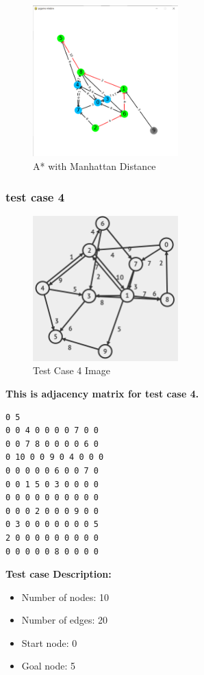 \begin{figure}[h!]
    \centering
    \includegraphics[width=0.5\textwidth]{result/testcase3/astar2.png}
    \caption{A* with Manhattan Distance}
\end{figure}
\clearpage 

\subsubsection{test case 4}
\begin{figure}[h!]
    \centering
    \includegraphics[width=0.5\textwidth]{testcase/4.PNG}
    \caption{Test Case 4 Image}
\end{figure}
\textbf{This is adjacency matrix for test case 4.}
\begin{verbatim}
0 5
0 0 4 0 0 0 0 7 0 0
0 0 7 8 0 0 0 0 6 0
0 10 0 0 9 0 4 0 0 0
0 0 0 0 0 6 0 0 7 0
0 0 1 5 0 3 0 0 0 0
0 0 0 0 0 0 0 0 0 0
0 0 0 2 0 0 0 9 0 0
0 3 0 0 0 0 0 0 0 5
2 0 0 0 0 0 0 0 0 0
0 0 0 0 0 8 0 0 0 0   
\end{verbatim}
\textbf{Test case Description:}
\begin{itemize}
    \item Number of nodes: 10 
    \item Number of edges: 20
    \item Start node: 0
    \item Goal node: 5
\end{itemize}


